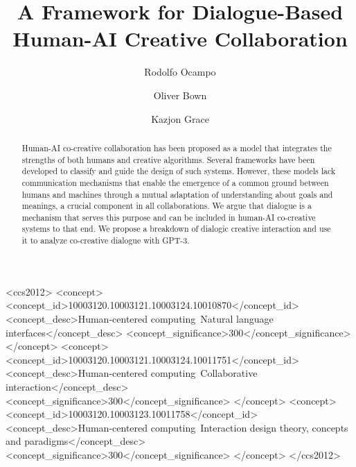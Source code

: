 \documentclass[manuscript,review]{acmart}
\begin{document}
\title{A Framework for Dialogue-Based Human-AI Creative Collaboration}


\author{Rodolfo Ocampo}
\email{}
\orcid{}
\author{Oliver Bown}
\authornotemark[1]
\email{}

\author{Kazjon Grace}


\renewcommand{\shortauthors}{Ocampo et al.}

\begin{abstract}
Human-AI co-creative collaboration has been proposed as a model that integrates the strengths of both humans and creative algorithms. Several frameworks have been developed to classify and guide the design of such systems. However, these models lack communication mechanisms that enable the emergence of a common ground between humans and machines through a mutual adaptation of understanding about goals and meanings, a crucial component in all collaborations. We argue that dialogue is a mechanism that serves this purpose and can be included in human-AI co-creative systems to that end. We propose a breakdown of dialogic creative interaction and use it to analyze co-creative dialogue with GPT-3. 
\end{abstract}

\begin{CCSXML}
<ccs2012>
   <concept>
       <concept_id>10003120.10003121.10003124.10010870</concept_id>
       <concept_desc>Human-centered computing~Natural language interfaces</concept_desc>
       <concept_significance>300</concept_significance>
       </concept>
   <concept>
       <concept_id>10003120.10003121.10003124.10011751</concept_id>
       <concept_desc>Human-centered computing~Collaborative interaction</concept_desc>
       <concept_significance>300</concept_significance>
       </concept>
   <concept>
       <concept_id>10003120.10003123.10011758</concept_id>
       <concept_desc>Human-centered computing~Interaction design theory, concepts and paradigms</concept_desc>
       <concept_significance>300</concept_significance>
       </concept>
 </ccs2012>
\end{CCSXML}
\end{document}
